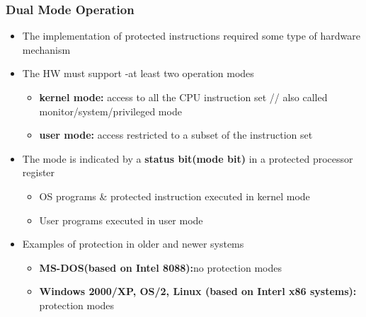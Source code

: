 \documentclass[11pt]{article}
\theoremstyle{definition}
\begin{document}
            \subsubsection{Dual Mode Operation}
                \begin{itemize}
                    \item The implementation of protected instructions required some type of hardware mechanism
                    \item The HW must support -at least two operation modes
                        \begin{itemize}
                            \item \textbf{kernel mode:} access to all the CPU instruction set // also called monitor/system/privileged mode
                            \item \textbf{user mode:} access restricted to a subset of the instruction set
                        \end{itemize}
                    \item The mode is indicated by a \textbf{status bit(mode bit)} in a protected processor register
                        \begin{itemize}
                            \item OS programs \& protected instruction executed in kernel mode
                            \item User programs executed in user mode
                        \end{itemize}
                    \item Examples of protection in older and newer systems
                        \begin{itemize}
                            \item \textbf{MS-DOS(based on Intel 8088):}no protection modes
                            \item \textbf{Windows 2000/XP, OS/2, Linux (based on Interl x86 systems):} protection modes
                        \end{itemize}
                \end{itemize}
\end{document}
